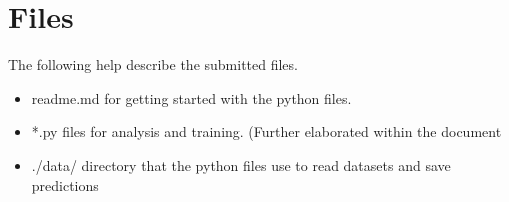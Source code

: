 \documentclass{article}
\begin{document}
\section*{Files}

The following help describe the submitted files.

\begin{itemize}
    \item readme.md for getting started with the python files.
    \item *.py files for analysis and training. (Further elaborated within the document
    \item ./data/ directory that the python files use to read datasets and save predictions
\end{itemize}
\end{document}
